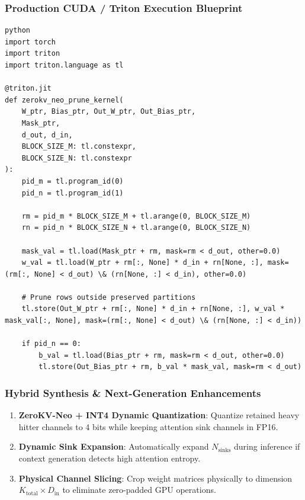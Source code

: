 \subsubsection*{Production CUDA / Triton Execution Blueprint}

\vspace{0.5em}
\begin{mdframed}[backgroundcolor=codebg, linecolor=codeframe, linewidth=1pt, roundcorner=4pt, innerleftmargin=2pt, innerrightmargin=5pt, innertopmargin=5pt, innerbottommargin=5pt]
\begin{lstlisting}
python
import torch
import triton
import triton.language as tl

@triton.jit
def zerokv_neo_prune_kernel(
    W_ptr, Bias_ptr, Out_W_ptr, Out_Bias_ptr,
    Mask_ptr,
    d_out, d_in,
    BLOCK_SIZE_M: tl.constexpr,
    BLOCK_SIZE_N: tl.constexpr
):
    pid_m = tl.program_id(0)
    pid_n = tl.program_id(1)

    rm = pid_m * BLOCK_SIZE_M + tl.arange(0, BLOCK_SIZE_M)
    rn = pid_n * BLOCK_SIZE_N + tl.arange(0, BLOCK_SIZE_N)

    mask_val = tl.load(Mask_ptr + rm, mask=rm < d_out, other=0.0)
    w_val = tl.load(W_ptr + rm[:, None] * d_in + rn[None, :], mask=(rm[:, None] < d_out) \& (rn[None, :] < d_in), other=0.0)

    # Prune rows outside preserved partitions
    tl.store(Out_W_ptr + rm[:, None] * d_in + rn[None, :], w_val * mask_val[:, None], mask=(rm[:, None] < d_out) \& (rn[None, :] < d_in))

    if pid_n == 0:
        b_val = tl.load(Bias_ptr + rm, mask=rm < d_out, other=0.0)
        tl.store(Out_Bias_ptr + rm, b_val * mask_val, mask=rm < d_out)
\end{lstlisting}
\end{mdframed}
\vspace{0.5em}


\subsubsection*{Hybrid Synthesis \& Next-Generation Enhancements}

\begin{enumerate}
\item \textbf{ZeroKV-Neo + INT4 Dynamic Quantization}: Quantize retained heavy hitter channels to 4 bits while keeping attention sink channels in FP16.
\item \textbf{Dynamic Sink Expansion}: Automatically expand $N_{\text{sinks}}$ during inference if context generation detects high attention entropy.
\item \textbf{Physical Channel Slicing}: Crop weight matrices physically to dimension $K_{\text{total}} \times D_{\text{in}}$ to eliminate zero-padded GPU operations.

\end{enumerate}
